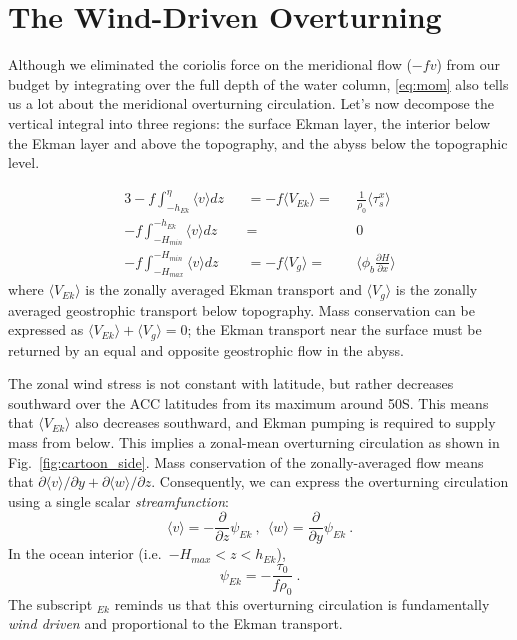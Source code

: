 \documentclass[12pt]{article}
\newcommand{\pd}[2]{ \frac{\partial #1}{\partial #2} }
\newcommand{\ab}[1]{\ensuremath{\langle #1 \rangle}}
\begin{document}
\section{The Wind-Driven Overturning}

Although we eliminated the coriolis force on the meridional flow ($-fv$) from our budget by integrating over the full depth of the water column, \eqref{eq:mom} also tells us a lot about the meridional overturning circulation. Let's now decompose the vertical integral into three regions: the surface Ekman layer, the interior below the Ekman layer and above the topography, and the abyss below the topographic level.

\begin{alignat}{3}
-f \int_{-h_{Ek}}^\eta \ab{v} dz&& = -f \ab{V_{Ek}} =&& \frac{1}{\rho_0} \ab{\tau^x_s} \\ 
-f \int_{-H_{min}}^{-h_{Ek}} \ab{v} dz&& =&& 0  \\
-f \int_{-H_{max}}^{-H_{min}} \ab{v} dz&& = -f \ab{V_g} =&& \ab{\phi_b \pd{H}{x}}
\end{alignat}
where $\ab{V_{Ek}}$ is the zonally averaged Ekman transport and $\ab{V_g}$ is the zonally averaged geostrophic transport below topography. Mass conservation can be expressed as $\ab{V_{Ek}} + \ab{V_g} = 0$; the Ekman transport near the surface must be returned by an equal and opposite geostrophic flow in the abyss.

The zonal wind stress is not constant with latitude, but rather decreases southward over the ACC latitudes from its maximum around 50S. This means that $\ab{V_{Ek}}$ also decreases southward, and Ekman pumping is required to supply mass from below. This implies a zonal-mean overturning circulation as shown in Fig.~\ref{fig:cartoon_side}. Mass conservation of the zonally-averaged flow means that $\partial \ab{v} / \partial y + \partial \ab{w} / \partial z$. Consequently, we can express the overturning circulation using a single scalar {\em streamfunction}:
\begin{equation}
\ab{v} = - \pd{}{z}\psi_{Ek} \ , \ \ \ab{w} = \pd{}{y}\psi_{Ek} \ .
\end{equation}
In the ocean interior (i.e.~$-H_{max} < z < h_{Ek}$),
\begin{equation}
\psi_{Ek} = -\frac{\tau_0}{f \rho_0} \ .
\end{equation}
The subscript $_{Ek}$ reminds us that this overturning circulation is fundamentally {\em wind driven} and proportional to the Ekman transport.
\end{document}

